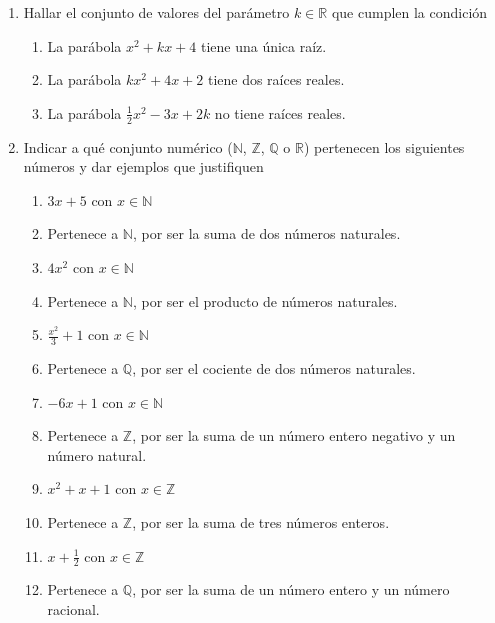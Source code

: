 \documentclass[a4paper]{article}
\newcommand{\answer}{\item[**]}
\newcommand{\exercise}{\item}
\begin{document}
\begin{enumerate}
\begin{multicols}{2}
\begin{enumerate} [label=(\alph*)]
		\item $-3$ divide a $11$
		\answer Incorrecto. $11$ no es múltiplo de $-3$ ya que no puede escribirse como $-3k$ con $k \in \mathbb{Z}$

	\end{enumerate}
	\end{multicols}

	\exercise Hallar el conjunto de valores del parámetro $k \in \mathbb{R}$ que cumplen la condición
	\begin{enumerate} [label=(\alph*)]

		\item La parábola $x^2+kx+4$ tiene una única raíz.

		\item La parábola $kx^2+4x+2$ tiene dos raíces reales.

		\item La parábola $\displaystyle\frac{1}{2}x^2-3x+2k$ no tiene raíces reales.
	\end{enumerate}

	\exercise Indicar a qué conjunto numérico ($\mathbb{N}$, $\mathbb{Z}$, $\mathbb{Q}$ o $\mathbb{R}$) pertenecen los siguientes números y dar ejemplos que justifiquen
	\begin{multicols}{2}
	\begin{enumerate} [label=(\alph*)]
		\item $3x+5$ con $x \in \mathbb{N}$
		\answer Pertenece a $\mathbb{N}$, por ser la suma de dos números naturales.

		\item $4x^2$ con $x \in \mathbb{N}$
		\answer Pertenece a $\mathbb{N}$, por ser el producto de números naturales.

		\item $\displaystyle\frac{x^2}{3}+1$ con $x \in \mathbb{N}$
		\answer Pertenece a $\mathbb{Q}$, por ser el cociente de dos números naturales. 

		\item $-6x+1$ con $x \in \mathbb{N}$
		\answer Pertenece a $\mathbb{Z}$, por ser la suma de un número entero negativo y un número natural.

		\item $x^2+x+1$ con $x \in \mathbb{Z}$
		\answer Pertenece a $\mathbb{Z}$, por ser la suma de tres números enteros.

		\item $x+\displaystyle\frac{1}{2}$ con $x \in \mathbb{Z}$
		\answer Pertenece a $\mathbb{Q}$, por ser la suma de un número entero y un número racional.


\end{enumerate}
\end{multicols}
\end{enumerate}
\end{document}
